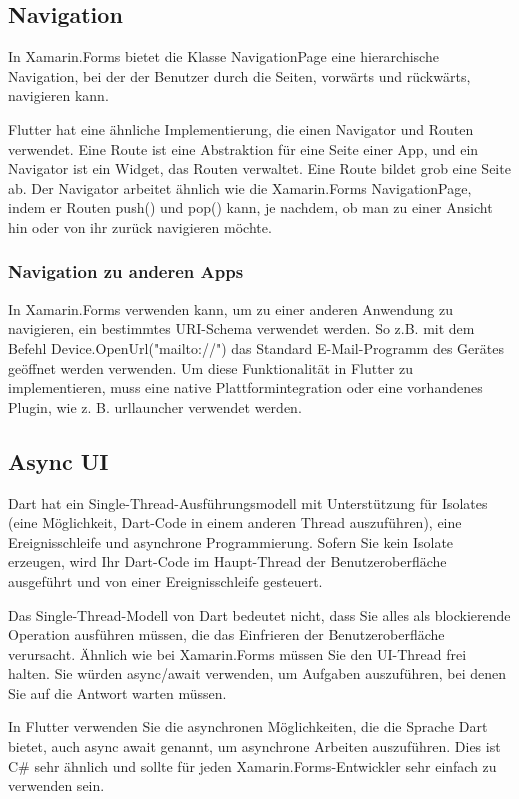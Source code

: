 \subsection{Navigation}
In Xamarin.Forms bietet die Klasse NavigationPage eine hierarchische Navigation, bei der der Benutzer durch die Seiten, vorwärts und rückwärts, navigieren kann.

Flutter hat eine ähnliche Implementierung, die einen Navigator und Routen verwendet. Eine Route ist eine Abstraktion für eine Seite einer App, und ein Navigator ist ein Widget, das Routen verwaltet. Eine Route bildet grob eine Seite ab. Der Navigator arbeitet ähnlich wie die Xamarin.Forms NavigationPage, indem er Routen push() und pop() kann, je nachdem, ob man zu einer Ansicht hin oder von ihr zurück navigieren möchte.

\subsubsection{Navigation zu anderen Apps}
In Xamarin.Forms verwenden kann, um zu einer anderen Anwendung zu navigieren, ein bestimmtes URI-Schema verwendet werden.  So z.B. mit dem Befehl Device.OpenUrl("mailto://") das Standard E-Mail-Programm des Gerätes geöffnet werden verwenden.
Um diese Funktionalität in Flutter zu implementieren,  muss eine native Plattformintegration oder eine vorhandenes Plugin, wie z. B. urllauncher verwendet werden.  
\subsection{Async UI}
Dart hat ein Single-Thread-Ausführungsmodell mit Unterstützung für Isolates (eine Möglichkeit, Dart-Code in einem anderen Thread auszuführen), eine Ereignisschleife und asynchrone Programmierung. Sofern Sie kein Isolate erzeugen, wird Ihr Dart-Code im Haupt-Thread der Benutzeroberfläche ausgeführt und von einer Ereignisschleife gesteuert.

Das Single-Thread-Modell von Dart bedeutet nicht, dass Sie alles als blockierende Operation ausführen müssen, die das Einfrieren der Benutzeroberfläche verursacht. Ähnlich wie bei Xamarin.Forms müssen Sie den UI-Thread frei halten. Sie würden async/await verwenden, um Aufgaben auszuführen, bei denen Sie auf die Antwort warten müssen.

In Flutter verwenden Sie die asynchronen Möglichkeiten, die die Sprache Dart bietet, auch async await genannt, um asynchrone Arbeiten auszuführen. Dies ist C\# sehr ähnlich und sollte für jeden Xamarin.Forms-Entwickler sehr einfach zu verwenden sein.


